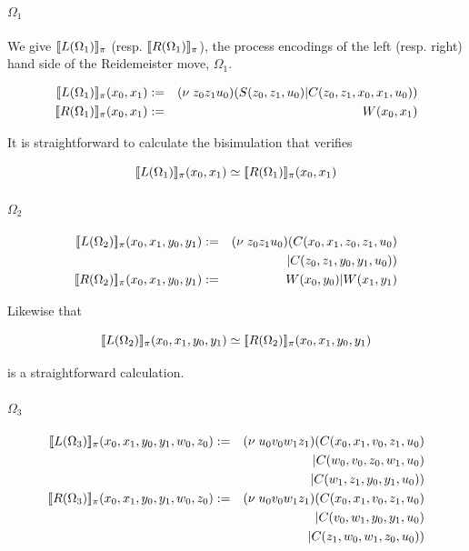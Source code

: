 \documentclass[]{llncs}
\begin{document}
\paragraph{$\Omega_1$}

We give $[\![ L(\Omega_1) ]\!]_{\pi}$
(resp. $[\![ R(\Omega_1) ]\!]_{\pi}$), the process encodings of the
left (resp. right) hand side of the Reidemeister move, $\Omega_1$.

\begin{eqnarray}
  \meaningof{L(\Omega_1)}_{\pi}(x_0,x_1) & := & (\nu \; z_0 z_1 u_0)(S(z_0,z_1,u_0) | C(z_0,z_1,x_0,x_1,u_0)) \\
  \meaningof{R(\Omega_1)}_{\pi}(x_0,x_1) & := & W(x_0,x_1)
\end{eqnarray}

It is straightforward to calculate the bisimulation that verifies

\begin{equation}
  [\![ L(\Omega_1) ]\!]_{\pi}(x_0,x_1) \simeq [\![ R(\Omega_1) ]\!]_{\pi}(x_0,x_1)
\end{equation}

\paragraph{$\Omega_2$}

\begin{eqnarray}
  \meaningof{L(\Omega_2)}_{\pi}(x_0,x_1,y_0,y_1) & := & (\nu \; z_0 z_1 u_0)(C(x_0,x_1,z_0,z_1,u_0) \nonumber \\
  & & | C(z_0,z_1,y_0,y_1,u_0)) \\
  \meaningof{R(\Omega_2)}_{\pi}(x_0,x_1,y_0,y_1) & := & W(x_0,y_0) | W(x_1,y_1)
\end{eqnarray}

Likewise that

\begin{equation}
  [\![ L(\Omega_2) ]\!]_{\pi}(x_0,x_1,y_0,y_1) \simeq [\![ R(\Omega_2) ]\!]_{\pi}(x_0,x_1,y_0,y_1)
\end{equation}

is a straightforward calculation.

\paragraph{$\Omega_3$}

\begin{eqnarray}
  \meaningof{L(\Omega_3)}_{\pi}(x_0,x_1,y_0,y_1,w_0,z_0) & := & (\nu \; u_0 v_0 w_1 z_1)(C(x_0,x_1,v_0,z_1,u_0) \nonumber \\
  & & | C(w_0,v_0,z_0,w_1,u_0) \nonumber \\
  & & | C(w_1,z_1,y_0,y_1,u_0)) \\
  \meaningof{R(\Omega_3)}_{\pi}(x_0,x_1,y_0,y_1,w_0,z_0) & := & (\nu \; u_0 v_0 w_1 z_1)(C(x_0,x_1,v_0,z_1,u_0) \nonumber \\
  & & | C(v_0,w_1,y_0,y_1,u_0) \nonumber \\
  & & | C(z_1,w_0,w_1,z_0,u_0)) \\
\end{eqnarray}
\end{document}
